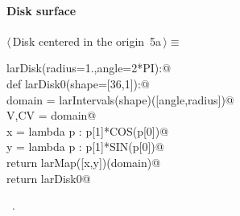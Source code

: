 \documentclass[11pt,oneside]{article}	%
\begin{document}
\paragraph{Disk surface}
\begin{flushleft} \small \label{scrap7}
\protect{}$\langle\,$Disk centered in the origin\nobreak\ {\footnotesize 5a}$\,\rangle\equiv$
\vspace{-1ex}
\begin{list}{}{} \item
\mbox{}\verb@def larDisk(radius=1.,angle=2*PI):@\\
\mbox{}\verb@   def larDisk0(shape=[36,1]):@\\
\mbox{}\verb@      domain = larIntervals(shape)([angle,radius])@\\
\mbox{}\verb@      V,CV = domain@\\
\mbox{}\verb@      x = lambda p : p[1]*COS(p[0])@\\
\mbox{}\verb@      y = lambda p : p[1]*SIN(p[0])@\\
\mbox{}\verb@      return larMap([x,y])(domain)@\\
\mbox{}\verb@   return larDisk0@\\
\mbox{}\verb@@{\NWsep}
\end{list}
\vspace{-1ex}
\footnotesize\addtolength{\baselineskip}{-1ex}
\begin{list}{}{\setlength{\itemsep}{-\parsep}\setlength{\itemindent}{-\leftmargin}}
\item \NWtxtMacroRefIn\ .
\end{list}
\end{flushleft}
\end{document}

